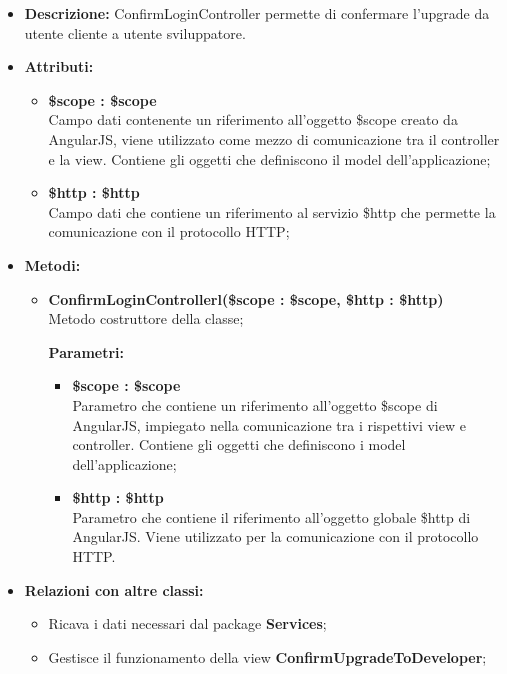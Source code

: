\begin{itemize}
	\item \textbf{Descrizione:} ConfirmLoginController permette di confermare l'upgrade da utente cliente a utente sviluppatore.
	\item \textbf{Attributi:}
	\begin{itemize}
		
		\item \textbf{\$scope : \$scope}\\
		Campo dati contenente un riferimento all'oggetto \$scope creato da AngularJS, viene utilizzato come mezzo di comunicazione tra il controller e la view. Contiene gli oggetti che definiscono il model dell'applicazione;
		
		\item \textbf{\$http : \$http }\\
		Campo dati che contiene un riferimento al servizio \$http che permette la comunicazione con il protocollo HTTP;
		
	\end{itemize}
	\item \textbf{Metodi:}
	\begin{itemize}
		
		\item \textbf{ConfirmLoginControllerl(\$scope : \$scope, \$http : \$http)}\\
		Metodo costruttore della classe;
		\begin{description}
			\item[\textbf{Parametri:}]
		\end{description}
		\begin{itemize}
			\item \textbf{\$scope : \$scope}\\
			Parametro che contiene un riferimento all'oggetto \$scope di AngularJS, impiegato nella comunicazione tra i rispettivi view e controller. Contiene gli oggetti che definiscono i model dell'applicazione;
			
			\item \textbf{\$http : \$http}\\
			Parametro che contiene il riferimento all'oggetto globale \$http di AngularJS. Viene utilizzato per la comunicazione con il protocollo HTTP.
			
		\end{itemize}		
		
	\end{itemize}
	\item \textbf{Relazioni con altre classi:}
	\begin{itemize}
		\item Ricava i dati necessari dal package \textbf{Services};
		\item Gestisce il funzionamento della view \textbf{ConfirmUpgradeToDeveloper};
	\end{itemize}
\end{itemize}

